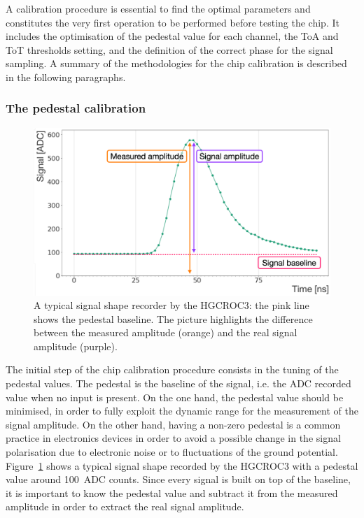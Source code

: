 A calibration procedure is essential to find the optimal parameters and constitutes the very first operation to be performed before testing the chip. It includes the optimisation of the pedestal value for each channel, the ToA and ToT thresholds setting, and the definition of the correct phase for the signal sampling. A summary of the methodologies for the chip calibration is described in the following paragraphs.

\subsubsection{The pedestal calibration}
\label{subsubsec:The pedestal calibration}

\begin{figure}
    \centering
    \includegraphics[width=0.6\linewidth]{Figures/HGCAL/SignalBaseline.pdf}
    \caption{A typical signal shape recorder by the HGCROC3: the pink line shows the pedestal baseline. The picture highlights the difference between the measured amplitude (orange) and the real signal amplitude (purple).}
    \label{fig:SignalBaseline}
\end{figure}

The initial step of the chip calibration procedure consists in the tuning of the pedestal values. The pedestal is the baseline of the signal, i.e. the ADC recorded value when no input is present. On the one hand, the pedestal value should be minimised, in order to fully exploit the dynamic range for the measurement of the signal amplitude. On the other hand, having a non-zero pedestal is a common practice in electronics devices in order to avoid a possible change in the signal polarisation due to electronic noise or to fluctuations of the ground potential.
Figure~\ref{fig:SignalBaseline} shows a typical signal shape recorded by the HGCROC3 with a pedestal value around 100~ADC counts. Since every signal is built on top of the baseline, it is important to know the pedestal value and subtract it from the measured amplitude in order to extract the real signal amplitude.

